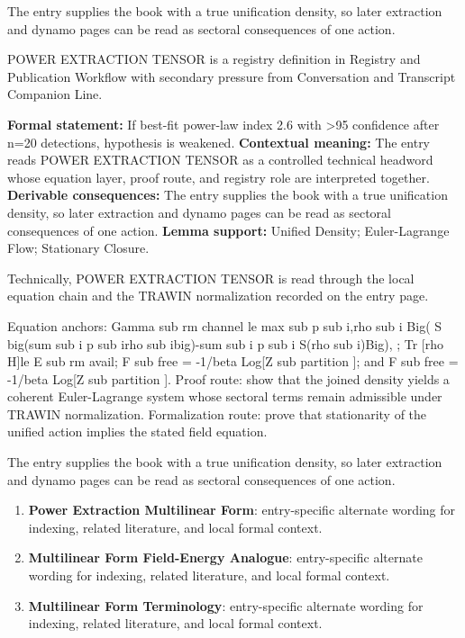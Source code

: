 The entry supplies the book with a true unification density, so later extraction and dynamo pages can be read as sectoral consequences of one action.
\clearpage


\begingroup\small
{}
POWER EXTRACTION TENSOR is a registry definition in Registry and Publication Workflow with secondary pressure from Conversation and Transcript Companion Line.

\begingroup\footnotesize\setlength{\emergencystretch}{3em}\sloppy
\textbf{Formal statement:} If best-fit power-law index 2.6 with >95 confidence after n=20 detections, hypothesis is weakened. \textbf{Contextual meaning:} The entry reads POWER EXTRACTION TENSOR as a controlled technical headword whose equation layer, proof route, and registry role are interpreted together. \textbf{Derivable consequences:} The entry supplies the book with a true unification density, so later extraction and dynamo pages can be read as sectoral consequences of one action. \textbf{Lemma support:} Unified Density; Euler-Lagrange Flow; Stationary Closure.\par
\endgroup

Technically, POWER EXTRACTION TENSOR is read through the local equation chain and the TRAWIN normalization recorded on the entry page.

Equation anchors: Gamma sub rm channel le max sub p sub i,rho sub i Big( S big(sum sub i p sub irho sub ibig)-sum sub i p sub i S(rho sub i)Big), ; Tr [rho H]le E sub rm avail; F sub free = -1/beta Log[Z sub partition ]; and F sub free = -1/beta Log[Z sub partition ]. Proof route: show that the joined density yields a coherent Euler-Lagrange system whose sectoral terms remain admissible under TRAWIN normalization. Formalization route: prove that stationarity of the unified action implies the stated field equation.

The entry supplies the book with a true unification density, so later extraction and dynamo pages can be read as sectoral consequences of one action.
\endgroup

\begin{enumerate}[leftmargin=1.6em,itemsep=6pt,topsep=4pt]
\item \textbf{Power Extraction Multilinear Form}: entry-specific alternate wording for indexing, related literature, and local formal context.
\item \textbf{Multilinear Form Field-Energy Analogue}: entry-specific alternate wording for indexing, related literature, and local formal context.
\item \textbf{Multilinear Form Terminology}: entry-specific alternate wording for indexing, related literature, and local formal context.
\end{enumerate}

